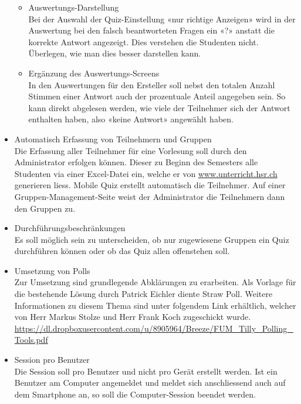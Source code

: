 \begin{itemize}
\begin{itemize}
		\item Auswertungs-Darstellung \\
		Bei der Auswahl der Quiz-Einstellung «nur richtige Anzeigen» wird in der Auswertung bei den falsch beantworteten Fragen ein «?» anstatt die korrekte Antwort angezeigt. Dies verstehen die Studenten nicht. Überlegen, wie man dies besser darstellen kann.
		
		\item Ergänzung des Auswertungs-Screens\\
		In den Auswertungen für den Ersteller soll nebst den totalen Anzahl Stimmen einer Antwort auch der prozentuale Anteil angegeben sein. So kann direkt abgelesen werden, wie viele der Teilnehmer sich der Antwort enthalten haben, also «keine Antwort» angewählt haben.
	\end{itemize}
	
	\item Automatisch Erfassung von Teilnehmern und Gruppen \\
	Die Erfassung aller Teilnehmer für eine Vorlesung soll durch den Administrator erfolgen können. Dieser zu Beginn des Semesters alle Studenten via einer Excel-Datei ein, welche er von \url{www.unterricht.hsr.ch} generieren liess. Mobile Quiz erstellt automatisch die Teilnehmer. Auf einer Gruppen-Management-Seite weist der Administrator die Teilnehmern dann den Gruppen zu.
	
	\item Durchführungsbeschränkungen \\
	Es soll möglich sein zu unterscheiden, ob nur zugewiesene Gruppen ein Quiz durchführen können oder ob das Quiz allen offenstehen soll.
	
	\item Umsetzung von Polls \\
	Zur Umsetzung sind  grundlegende Abklärungen zu erarbeiten.
	Als Vorlage für die bestehende Lösung durch Patrick Eichler diente \glqq Straw Poll\grqq . \cite{straw_poll} Weitere Informationen zu diesem Thema sind unter folgendem Link erhältlich, welcher von Herr Markus Stolze und Herr Frank Koch zugeschickt wurde. \url{https://dl.dropboxusercontent.com/u/8905964/Breeze/FUM_Tilly_Polling_Tools.pdf}
	
	\item Session pro Benutzer \\
	Die Session soll pro Benutzer und nicht pro Gerät erstellt werden. Ist ein Benutzer am Computer angemeldet und meldet sich anschliessend auch auf dem Smartphone an, so soll die Computer-Session beendet werden.
	

\end{itemize}
